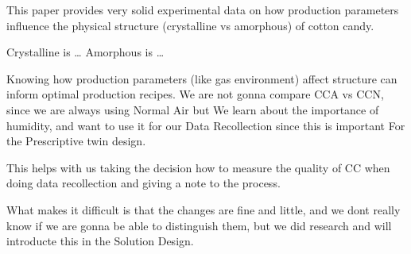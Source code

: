 
This paper provides very solid experimental data on how production parameters influence the physical structure (crystalline vs amorphous) of cotton candy.

Crystalline is \dots
Amorphous is \dots


Knowing how production parameters (like gas environment) affect structure can inform optimal production recipes. We are not gonna compare CCA vs CCN, since we are always using Normal Air but
We learn about the importance of humidity, and want to use it for our Data Recollection since this is important For the Prescriptive twin design.

This helps with us taking the decision how to measure the quality of CC when doing data recollection and giving a note to the process.

What makes it difficult is that the changes are fine and little, and we dont really know if we are gonna be able to distinguish them, but we did research and will introducte this in the Solution Design.


